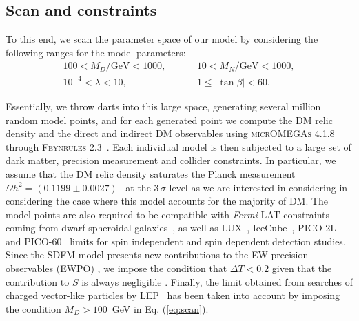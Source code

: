 \subsection{Scan and constraints}

To this end, we scan the parameter space of our model by considering the following ranges for the model parameters:    
\begin{align}\label{eq:scan}
100<M_D/\text{GeV}<1000,&\hspace{1cm}10 <M_N/\text{GeV}<1000,\nonumber\\
10^{-4}<\lambda<10,&\hspace{1cm} 1\leq\left|\tan\beta\right|<60.
\end{align}

Essentially, we throw darts into this large space, generating several million random model points, and for each generated point we compute the DM relic density and the direct and indirect DM observables using \textsc{micrOMEGAs 4.1.8}~\cite{Belanger:2014vza} through \textsc{Feynrules 2.3}~\cite{Christensen:2008py}. Each individual model is then subjected to a large set of dark matter, precision measurement and collider constraints. In particular, we assume that the DM  relic density saturates the Planck measurement $\Omega h^2=(0.1199 \pm 0.0027)$~\cite{Ade:2013zuv} at the $3\,\sigma$ level as we are interested in considering in considering the case where this model accounts for the majority of DM. The model points are also required to be compatible with \textit{Fermi}-LAT constraints coming from dwarf spheroidal galaxies~\cite{Ackermann:2015zua}, as well as LUX~\cite{Akerib:2013tjd}, IceCube~\cite{2013PhRvL.110m1302A}, PICO-2L~\cite{Amole:2016pye} and PICO-60~\cite{Amole:2015pla}  limits for spin independent and spin dependent detection studies. 
Since the SDFM model presents new contributions to the EW precision observables (EWPO) \cite{D'Eramo:2007ga}, we impose the condition that $\Delta T < 0.2$ given that the contribution to $S$ is always negligible \cite{Calibbi:2015nha}.  Finally, the limit obtained from searches of charged vector-like particles by LEP~\cite{ALEPH:2005ab} has been taken into account by imposing the condition $M_D > 100$~GeV in Eq. (\ref{eq:scan}). 



